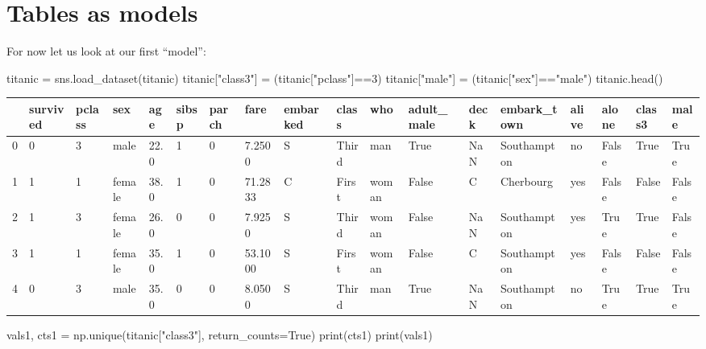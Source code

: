 \documentclass[
  letterpaper,
  DIV=11,
  numbers=noendperiod]{scrreprt}
\newenvironment{Shaded}{\begin{snugshade}}{\end{snugshade}}
\newcommand{\BuiltInTok}[1]{\textcolor[rgb]{0.00,0.23,0.31}{#1}}
\newcommand{\DecValTok}[1]{\textcolor[rgb]{0.68,0.00,0.00}{#1}}
\newcommand{\NormalTok}[1]{\textcolor[rgb]{0.00,0.23,0.31}{#1}}
\newcommand{\OperatorTok}[1]{\textcolor[rgb]{0.37,0.37,0.37}{#1}}
\newcommand{\StringTok}[1]{\textcolor[rgb]{0.13,0.47,0.30}{#1}}
\newcommand{\VariableTok}[1]{\textcolor[rgb]{0.07,0.07,0.07}{#1}}
\begin{document}
\hypertarget{tables-as-models}{%
\section{Tables as models}\label{tables-as-models}}

For now let us look at our first ``model'':

\begin{Shaded}
\begin{Highlighting}[]
\NormalTok{titanic }\OperatorTok{=}\NormalTok{ sns.load\_dataset(}\StringTok{\textquotesingle{}titanic\textquotesingle{}}\NormalTok{)}
\NormalTok{titanic[}\StringTok{"class3"}\NormalTok{] }\OperatorTok{=}\NormalTok{ (titanic[}\StringTok{"pclass"}\NormalTok{]}\OperatorTok{==}\DecValTok{3}\NormalTok{)}
\NormalTok{titanic[}\StringTok{"male"}\NormalTok{] }\OperatorTok{=}\NormalTok{ (titanic[}\StringTok{"sex"}\NormalTok{]}\OperatorTok{==}\StringTok{"male"}\NormalTok{)}
\NormalTok{titanic.head()}
\end{Highlighting}
\end{Shaded}

\begin{longtable}[]{@{}llllllllllllllllll@{}}
\toprule()
& survived & pclass & sex & age & sibsp & parch & fare & embarked &
class & who & adult\_male & deck & embark\_town & alive & alone & class3
& male \\
\midrule()
\endhead
0 & 0 & 3 & male & 22.0 & 1 & 0 & 7.2500 & S & Third & man & True & NaN
& Southampton & no & False & True & True \\
1 & 1 & 1 & female & 38.0 & 1 & 0 & 71.2833 & C & First & woman & False
& C & Cherbourg & yes & False & False & False \\
2 & 1 & 3 & female & 26.0 & 0 & 0 & 7.9250 & S & Third & woman & False &
NaN & Southampton & yes & True & True & False \\
3 & 1 & 1 & female & 35.0 & 1 & 0 & 53.1000 & S & First & woman & False
& C & Southampton & yes & False & False & False \\
4 & 0 & 3 & male & 35.0 & 0 & 0 & 8.0500 & S & Third & man & True & NaN
& Southampton & no & True & True & True \\
\bottomrule()
\end{longtable}

\begin{Shaded}
\begin{Highlighting}[]
\NormalTok{vals1, cts1 }\OperatorTok{=}\NormalTok{ np.unique(titanic[}\StringTok{"class3"}\NormalTok{], return\_counts}\OperatorTok{=}\VariableTok{True}\NormalTok{)}
\BuiltInTok{print}\NormalTok{(cts1)}
\BuiltInTok{print}\NormalTok{(vals1)}
\end{Highlighting}
\end{Shaded}
\end{document}
